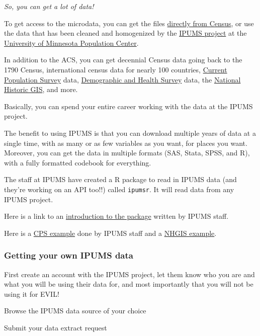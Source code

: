 \documentclass[]{article}
\begin{document}
\emph{So, you can get a lot of data!}

To get access to the microdata, you can get the files
\href{https://www.census.gov/programs-surveys/acs/data/pums.html}{directly
from Census}, or use the data that has been cleaned and homogenized by
the \href{https://www.ipums.org/}{IPUMS project} at the
\href{https://pop.umn.edu/}{University of Minnesota Population Center}.

In addition to the ACS, you can get decennial Census data going back to
the 1790 Census, international census data for nearly 100 countries,
\href{https://www.census.gov/programs-surveys/cps.html}{Current
Population Survey} data, \href{https://dhsprogram.com/}{Demographic and
Health Survey} data, the \href{https://www.nhgis.org/}{National Historic
GIS}, and more.

Basically, you can spend your entire career working with the data at the
IPUMS project.

The benefit to using IPUMS is that you can download multiple years of
data at a single time, with as many or as few variables as you want, for
places you want. Moreover, you can get the data in multiple formats
(SAS, Stata, SPSS, and R), with a fully formatted codebook for
everything.

The staff at IPUMS have created a R package to read in IPUMS data (and
they're working on an API too!!) called \texttt{ipumsr}. It will read
data from any IPUMS project.

Here is a link to an
\href{https://cran.r-project.org/web/packages/ipumsr/vignettes/ipums.html}{introduction
to the package} written by IPUMS staff.

Here is a
\href{https://cran.r-project.org/web/packages/ipumsr/vignettes/ipums-cps.html}{CPS
example} done by IPUMS staff and a
\href{https://cran.r-project.org/web/packages/ipumsr/vignettes/ipums-nhgis.html}{NHGIS
example}.

\subsubsection{Getting your own IPUMS
data}\label{getting-your-own-ipums-data}

First create an account with the IPUMS project, let them know who you
are and what you will be using their data for, and most importantly that
you will not be using it for EVIL!

Browse the IPUMS data source of your choice

Submit your data extract request
\end{document}

